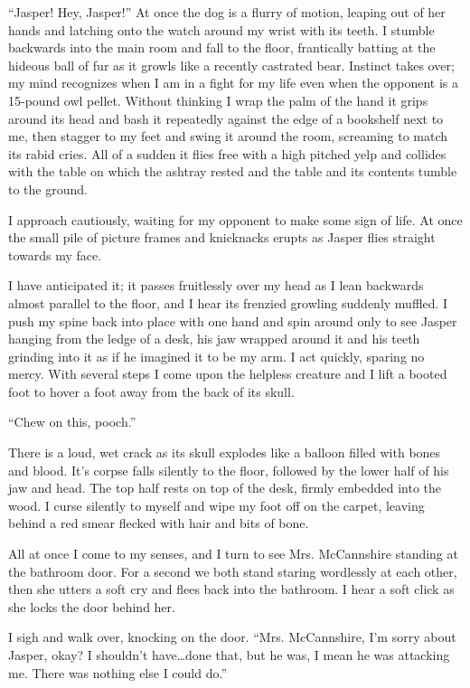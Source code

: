 ``Jasper! Hey, Jasper!'' At once the dog is a flurry of motion, leaping
out of her hands and latching onto the watch around my wrist with its
teeth. I stumble backwards into the main room and fall to the floor,
frantically batting at the hideous ball of fur as it growls like a
recently castrated bear. Instinct takes over; my mind recognizes when I
am in a fight for my life even when the opponent is a 15-pound owl
pellet. Without thinking I wrap the palm of the hand it grips around its
head and bash it repeatedly against the edge of a bookshelf next to me,
then stagger to my feet and swing it around the room, screaming to match
its rabid cries. All of a sudden it flies free with a high pitched yelp
and collides with the table on which the ashtray rested and the table
and its contents tumble to the ground.

I approach cautiously, waiting for my opponent to make some sign of
life. At once the small pile of picture frames and knicknacks erupts as
Jasper flies straight towards my face.

I have anticipated it; it passes fruitlessly over my head as I lean
backwards almost parallel to the floor, and I hear its frenzied growling
suddenly muffled. I push my spine back into place with one hand and spin
around only to see Jasper hanging from the ledge of a desk, his jaw
wrapped around it and his teeth grinding into it as if he imagined it to
be my arm. I act quickly, sparing no mercy. With several steps I come
upon the helpless creature and I lift a booted foot to hover a foot away
from the back of its skull.

``Chew on this, pooch.''

There is a loud, wet crack as its skull explodes like a balloon filled
with bones and blood. It's corpse falls silently to the floor, followed
by the lower half of his jaw and head. The top half rests on top of the
desk, firmly embedded into the wood. I curse silently to myself and wipe
my foot off on the carpet, leaving behind a red smear flecked with hair
and bits of bone.

All at once I come to my senses, and I turn to see Mrs. McCannshire
standing at the bathroom door. For a second we both stand staring
wordlessly at each other, then she utters a soft cry and flees back into
the bathroom. I hear a soft click as she locks the door behind her.

I sigh and walk over, knocking on the door. ``Mrs. McCannshire, I'm sorry
about Jasper, okay? I shouldn't have\ldots done that, but he was, I mean he
was attacking me. There was nothing else I could do.''

